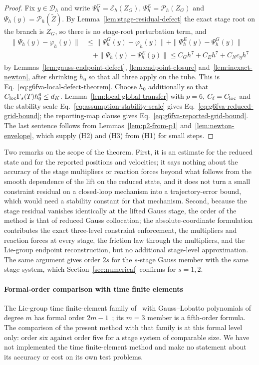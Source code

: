 \begin{proof}
Fix $y\in\mathcal D_h$ and write $\Psi_h^G=\mathcal E_h(Z_G)$, $\Psi_h^E=\mathcal P_h(Z_G)$ and
$\Psi_h(y)=\mathcal P_h(\widetilde Z)$. By Lemma~\ref{lem:stage-residual-defect} the exact stage
root on the branch is $Z_G$, so there is no stage-root perturbation term, and
\begin{equation}
\label{eq:three-term-local-defect-sum}
\begin{aligned}
  \|\Psi_h(y)-\varphi_h(y)\|
  &\le\|\Psi_h^G(y)-\varphi_h(y)\|+\|\Psi_h^E(y)-\Psi_h^G(y)\|\\
  &\quad+\|\Psi_h(y)-\Psi_h^E(y)\|
  \le C_Gh^7+C_Eh^7+C_Nc_\eta h^7
\end{aligned}
\end{equation}
by Lemmas~\ref{lem:gauss-endpoint-defect}, \ref{lem:endpoint-closure}
and~\ref{lem:inexact-newton}, after shrinking $h_0$ so that all three apply on the tube. This is
Eq.~\eqref{eq:g6fva-local-defect-theorem}. Choose $h_0$ additionally so that
$C_{\rm loc}\Gamma_s(T)h_0^6\le d_K$. Lemma~\ref{lem:local-global-transfer} with $p=6$,
$C_\ell=C_{\rm loc}$ and the stability scale Eq.~\eqref{eq:assumption-stability-scale} gives
Eq.~\eqref{eq:g6fva-reduced-grid-bound}; the reporting-map clause gives
Eq.~\eqref{eq:g6fva-reported-grid-bound}. The last sentence follows from
Lemmas~\ref{lem:p2-from-p1} and~\ref{lem:newton-envelope}, which supply (H2) and (H3) from (H1) for
small steps.
\end{proof}

Two remarks on the scope of the theorem. First, it is an estimate for the reduced state and for the
reported positions and velocities; it says nothing about the accuracy of the stage multipliers or
reaction forces beyond what follows from the smooth dependence of the lift on the reduced state, and
it does not turn a small constraint residual on a closed-loop mechanism into a trajectory-error
bound, which would need a stability constant for that mechanism. Second, because the stage residual
vanishes identically at the lifted Gauss stage, the order of the method is that of reduced Gauss
collocation; the absolute-coordinate formulation contributes the exact three-level constraint
enforcement, the multipliers and reaction forces at every stage, the friction law through the
multipliers, and the Lie-group endpoint reconstruction, but no additional stage-level
approximation. The same argument gives order $2s$ for the $s$-stage Gauss member with the same
stage system, which Section~\ref{sec:numerical} confirms for $s=1,2$.

\paragraph{Formal-order comparison with time finite elements}
The Lie-group time finite-element family of~\cite{chaturvedi2026tfe} with Gauss--Lobatto
polynomials of degree $m$ has formal order $2m-1$~\cite{kim2017higher}; its $m=3$ member is a
fifth-order formula. The comparison of the present method with that family is at this formal level
only: order six against order five for a stage system of comparable size. We have not implemented
the time finite-element method and make no statement about its accuracy or cost on its own test
problems.
